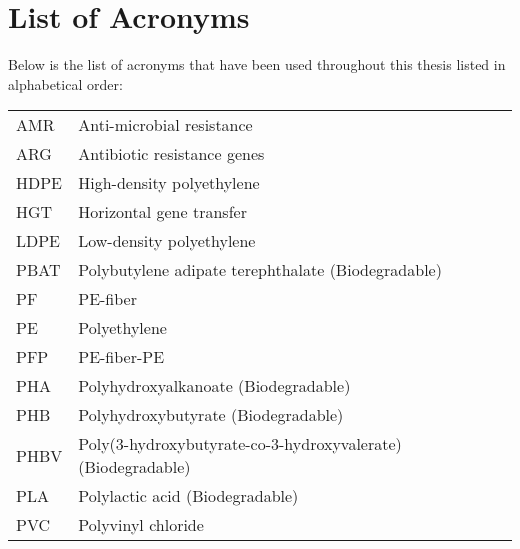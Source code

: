 \thispagestyle{plain}			%
\chapter*{List of Acronyms}
Below is the list of acronyms that have been used throughout this thesis listed in alphabetical order:
\vspace*{1.0cm}

\begin{tabular}{p{3cm}p{12cm}}
AMR & Anti-microbial resistance \\
ARG & Antibiotic resistance genes \\
HDPE & High-density polyethylene \\
HGT & Horizontal gene transfer \\
LDPE & Low-density polyethylene \\
PBAT & Polybutylene adipate terephthalate (Biodegradable) \\
PF & PE-fiber \\
PE & Polyethylene \\
PFP & PE-fiber-PE \\
PHA & Polyhydroxyalkanoate (Biodegradable) \\
PHB & Polyhydroxybutyrate (Biodegradable) \\
PHBV & Poly(3-hydroxybutyrate-co-3-hydroxyvalerate) (Biodegradable) \\
PLA & Polylactic acid (Biodegradable) \\
PVC & Polyvinyl chloride
\end{tabular}





\newpage				%
\thispagestyle{empty}
\mbox{}

